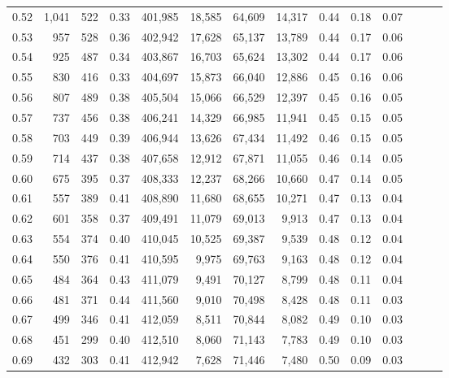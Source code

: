 \begin{tabular}{rrrrrrrrrrrrrr}
0.52 &   1,041 &    522 &  0.33 &  401,985 &   18,585 &  64,609 &  14,317 &  0.44 &  0.18 &      0.07 \\
0.53 &     957 &    528 &  0.36 &  402,942 &   17,628 &  65,137 &  13,789 &  0.44 &  0.17 &      0.06 \\
0.54 &     925 &    487 &  0.34 &  403,867 &   16,703 &  65,624 &  13,302 &  0.44 &  0.17 &      0.06 \\
0.55 &     830 &    416 &  0.33 &  404,697 &   15,873 &  66,040 &  12,886 &  0.45 &  0.16 &      0.06 \\
0.56 &     807 &    489 &  0.38 &  405,504 &   15,066 &  66,529 &  12,397 &  0.45 &  0.16 &      0.05 \\
0.57 &     737 &    456 &  0.38 &  406,241 &   14,329 &  66,985 &  11,941 &  0.45 &  0.15 &      0.05 \\
0.58 &     703 &    449 &  0.39 &  406,944 &   13,626 &  67,434 &  11,492 &  0.46 &  0.15 &      0.05 \\
0.59 &     714 &    437 &  0.38 &  407,658 &   12,912 &  67,871 &  11,055 &  0.46 &  0.14 &      0.05 \\
0.60 &     675 &    395 &  0.37 &  408,333 &   12,237 &  68,266 &  10,660 &  0.47 &  0.14 &      0.05 \\
0.61 &     557 &    389 &  0.41 &  408,890 &   11,680 &  68,655 &  10,271 &  0.47 &  0.13 &      0.04 \\
0.62 &     601 &    358 &  0.37 &  409,491 &   11,079 &  69,013 &   9,913 &  0.47 &  0.13 &      0.04 \\
0.63 &     554 &    374 &  0.40 &  410,045 &   10,525 &  69,387 &   9,539 &  0.48 &  0.12 &      0.04 \\
0.64 &     550 &    376 &  0.41 &  410,595 &    9,975 &  69,763 &   9,163 &  0.48 &  0.12 &      0.04 \\
0.65 &     484 &    364 &  0.43 &  411,079 &    9,491 &  70,127 &   8,799 &  0.48 &  0.11 &      0.04 \\
0.66 &     481 &    371 &  0.44 &  411,560 &    9,010 &  70,498 &   8,428 &  0.48 &  0.11 &      0.03 \\
0.67 &     499 &    346 &  0.41 &  412,059 &    8,511 &  70,844 &   8,082 &  0.49 &  0.10 &      0.03 \\
0.68 &     451 &    299 &  0.40 &  412,510 &    8,060 &  71,143 &   7,783 &  0.49 &  0.10 &      0.03 \\
0.69 &     432 &    303 &  0.41 &  412,942 &    7,628 &  71,446 &   7,480 &  0.50 &  0.09 &      0.03 \\

\end{tabular}
